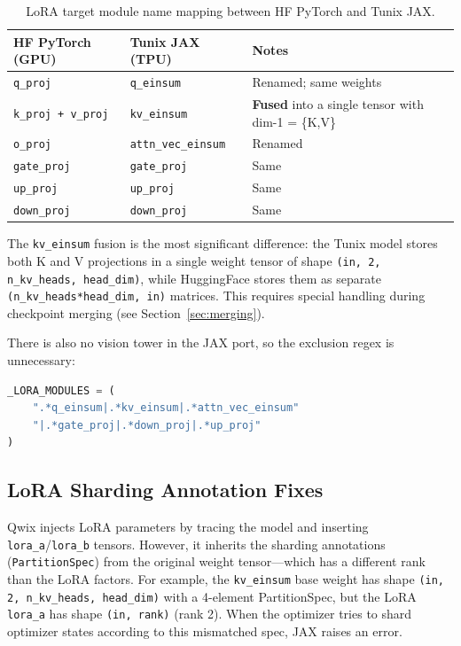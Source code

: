\documentclass[11pt,a4paper]{article}
\begin{document}
\begin{table}[H]
\centering
\caption{LoRA target module name mapping between HF PyTorch and Tunix JAX.}
\begin{tabular}{lll}
\toprule
\textbf{HF PyTorch (GPU)} & \textbf{Tunix JAX (TPU)} & \textbf{Notes} \\
\midrule
\texttt{q\_proj} & \texttt{q\_einsum} & Renamed; same weights \\
\texttt{k\_proj + v\_proj} & \texttt{kv\_einsum} & \textbf{Fused} into a single tensor with dim-1 = \{K,V\} \\
\texttt{o\_proj} & \texttt{attn\_vec\_einsum} & Renamed \\
\texttt{gate\_proj} & \texttt{gate\_proj} & Same \\
\texttt{up\_proj} & \texttt{up\_proj} & Same \\
\texttt{down\_proj} & \texttt{down\_proj} & Same \\
\bottomrule
\end{tabular}
\end{table}

The \texttt{kv\_einsum} fusion is the most significant difference: the Tunix model stores both K and V projections in a single weight tensor of shape \texttt{(in, 2, n\_kv\_heads, head\_dim)}, while HuggingFace stores them as separate \texttt{(n\_kv\_heads*head\_dim, in)} matrices. This requires special handling during checkpoint merging (see Section~\ref{sec:merging}).

There is also no vision tower in the JAX port, so the exclusion regex is unnecessary:
\begin{lstlisting}[language=python]
_LORA_MODULES = (
    ".*q_einsum|.*kv_einsum|.*attn_vec_einsum"
    "|.*gate_proj|.*down_proj|.*up_proj"
)
\end{lstlisting}

\subsection{LoRA Sharding Annotation Fixes}

Qwix injects LoRA parameters by tracing the model and inserting \texttt{lora\_a}/\texttt{lora\_b} tensors. However, it inherits the sharding annotations (\texttt{PartitionSpec}) from the original weight tensor---which has a different rank than the LoRA factors. For example, the \texttt{kv\_einsum} base weight has shape \texttt{(in, 2, n\_kv\_heads, head\_dim)} with a 4-element PartitionSpec, but the LoRA \texttt{lora\_a} has shape \texttt{(in, rank)} (rank 2). When the optimizer tries to shard optimizer states according to this mismatched spec, JAX raises an error.
\end{document}
